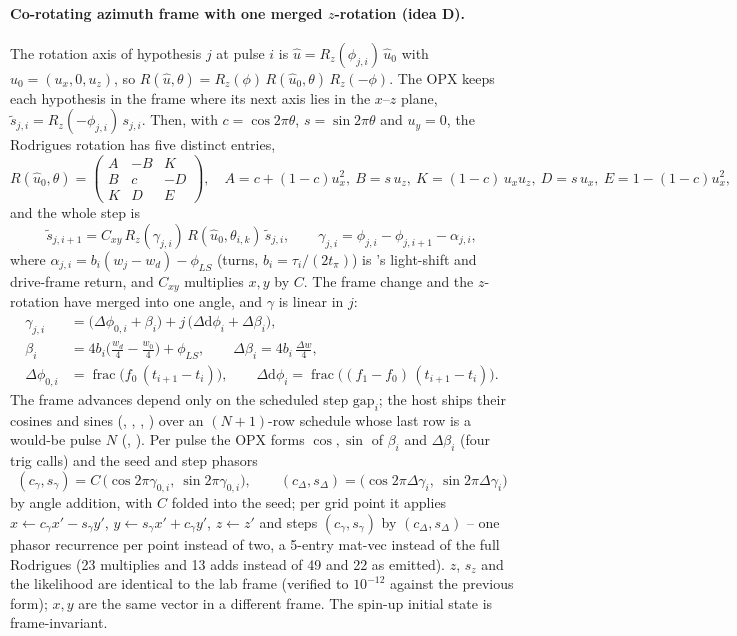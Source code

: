 \paragraph{Co-rotating azimuth frame with one merged $z$-rotation (idea D).}
The rotation axis of hypothesis $j$ at pulse $i$ is $\hat u = R_z(\phi_{j,i})\,\hat
u_0$ with $\hat u_0 = (u_x, 0, u_z)$, so $R(\hat u, \theta) = R_z(\phi)\,R(\hat u_0,
\theta)\,R_z(-\phi)$. The OPX keeps each hypothesis in the frame where its
next axis lies in the $x$--$z$ plane, $\tilde s_{j,i} = R_z(-\phi_{j,i})\,s_{j,i}$.
Then, with $c = \cos 2\pi\theta$, $s = \sin 2\pi\theta$ and $u_y = 0$, the Rodrigues
rotation has five distinct entries,
\[
  R(\hat u_0, \theta) =
  \begin{pmatrix} A & -B & K \\ B & c & -D \\ K & D & E \end{pmatrix},\quad
  A = c + (1-c)u_x^2,\ B = s\,u_z,\ K = (1-c)\,u_xu_z,\ D = s\,u_x,\ E = 1 - (1-c)u_x^2,
\]
and the whole step is
\[
  \tilde s_{j,i+1} = C_{xy}\,R_z(\gamma_{j,i})\,R(\hat u_0, \theta_{i,k})\,\tilde s_{j,i},\qquad
  \gamma_{j,i} = \phi_{j,i} - \phi_{j,i+1} - \alpha_{j,i},
\]
where $\alpha_{j,i} = b_i(w_j - w_d) - \phi_{LS}$ (turns, $b_i = \tau_i/(2t_\pi)$) is
's light-shift and drive-frame return, and $C_{xy}$
multiplies $x, y$ by $C$. The frame change and the $z$-rotation have merged
into one angle, and $\gamma$ is linear in $j$:
\begin{align*}
  \gamma_{j,i} &= \big(\Delta\phi_{0,i} + \beta_i\big) + j\,\big(\Delta\mathrm{d}\phi_i + \Delta\beta_i\big),\\
  \beta_i &= 4b_i\Big(\frac{w_d}{4} - \frac{w_0}{4}\Big) + \phi_{LS},\qquad \Delta\beta_i = 4b_i\,\frac{\Delta w}{4},\\
  \Delta\phi_{0,i} &= \operatorname{frac}\big(f_0\,(t_{i+1} - t_i)\big),\qquad
  \Delta\mathrm{d}\phi_i = \operatorname{frac}\big((f_1 - f_0)\,(t_{i+1} - t_i)\big).
\end{align*}
The frame advances depend only on the scheduled step $\mathrm{gap}_i$; the
host ships their cosines and sines (, ,
, ) over an $(N{+}1)$-row schedule whose last
row is a would-be pulse $N$ (,
). Per pulse the OPX forms $\cos,\sin$ of $\beta_i$
and $\Delta\beta_i$ (four trig calls) and the seed and step phasors
\[
  (c_\gamma, s_\gamma) = C\,\big(\cos 2\pi\gamma_{0,i},\ \sin 2\pi\gamma_{0,i}\big),\qquad
  (c_\Delta, s_\Delta) = \big(\cos 2\pi\Delta\gamma_i,\ \sin 2\pi\Delta\gamma_i\big)
\]
by angle addition, with $C$ folded into the seed; per grid point it applies
$x \leftarrow c_\gamma x' - s_\gamma y'$, $y \leftarrow s_\gamma x' + c_\gamma y'$, $z
\leftarrow z'$ and steps $(c_\gamma, s_\gamma)$ by $(c_\Delta, s_\Delta)$ -- one phasor
recurrence per point instead of two, a 5-entry mat-vec instead of the full
Rodrigues (23 multiplies and 13 adds instead of 49 and 22 as emitted). $z$,
$s_z$ and the likelihood are identical to the lab frame (verified to
$10^{-12}$ against the previous form); $x, y$ are the same vector in a
different frame. The spin-up initial state is frame-invariant.

